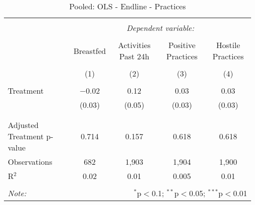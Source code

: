 
\begin{table}[!htbp] \centering 
  \caption{Pooled: OLS - Endline - Practices} 
  \label{tbl:Pooled: OLS - Endline - Practices} 
\begin{tabular}{@{\extracolsep{5pt}}lcccc} 
\\[-1.8ex]\hline 
\hline \\[-1.8ex] 
 & \multicolumn{4}{c}{\textit{Dependent variable:}} \\ 
\cline{2-5} 
\\[-1.8ex] & Breastfed & Activities Past 24h & Positive Practices & Hostile Practices \\ 
\\[-1.8ex] & (1) & (2) & (3) & (4)\\ 
\hline \\[-1.8ex] 
 Treatment & $-$0.02 & 0.12 & 0.03 & 0.03 \\ 
  & (0.03) & (0.05) & (0.03) & (0.03) \\ 
  & & & & \\ 
\hline \\[-1.8ex] 
Adjusted Treatment p-value & 0.714 & 0.157 & 0.618 & 0.618 \\ 
Observations & 682 & 1,903 & 1,904 & 1,900 \\ 
R$^{2}$ & 0.02 & 0.01 & 0.005 & 0.01 \\ 
\hline 
\hline \\[-1.8ex] 
\textit{Note:}  & \multicolumn{4}{r}{$^{*}$p$<$0.1; $^{**}$p$<$0.05; $^{***}$p$<$0.01} \\ 
\end{tabular} 
\end{table} 
